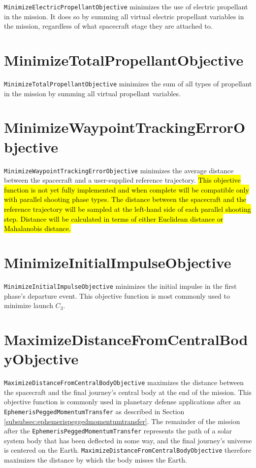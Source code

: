 \texttt{MinimizeElectricPropellantObjective} minimizes the use of electric propellant in the mission. It does so by summing all virtual electric propellant variables in the mission, regardless of what spacecraft stage they are attached to.

\section{MinimizeTotalPropellantObjective}
\label{sec:MinimizeTotalPropellantObjective}

\texttt{MinimizeTotalPropellantObjective} minimizes the sum of all types of propellant in the mission by summing all virtual propellant variables.

\section{MinimizeWaypointTrackingErrorObjective}
\label{sec:MinimizeWaypointTrackingErrorObjective}

\texttt{MinimizeWaypointTrackingErrorObjective} minimizes the average distance between the spacecraft and a user-supplied reference trajectory. \hl{This objective function is not yet fully implemented and when complete will be compatible only with parallel shooting phase types. The distance between the spacecraft and the reference trajectory will be sampled at the left-hand side of each parallel shooting step. Distance will be calculated in terms of either Euclidean distance or Mahalanobis distance.}

\section{MinimizeInitialImpulseObjective}
\label{sec:MinimizeInitialImpulseObjective}

\texttt{MinimizeInitialImpulseObjective} minimizes the initial impulse in the first phase's departure event. This objective function is most commonly used to minimize launch $C_3$.

\section{MaximizeDistanceFromCentralBodyObjective}
\label{sec:MaximizeDistanceFromCentralBodyObjective}

\texttt{MaximizeDistanceFromCentralBodyObjective} maximizes the distance between the spacecraft and the final journey's central body at the end of the mission. This objective function is commonly used in planetary defense applications after an \texttt{EphemerisPeggedMomentumTransfer} as described in Section \ref{subsubsec:ephemerispeggedmomentumtransfer}. The remainder of the mission after the \texttt{EphemerisPeggedMomentumTransfer} represents the path of a solar system body that has been deflected in some way, and the final journey's universe is centered on the Earth. \texttt{MaximizeDistanceFromCentralBodyObjective} therefore maximizes the distance by which the body misses the Earth.